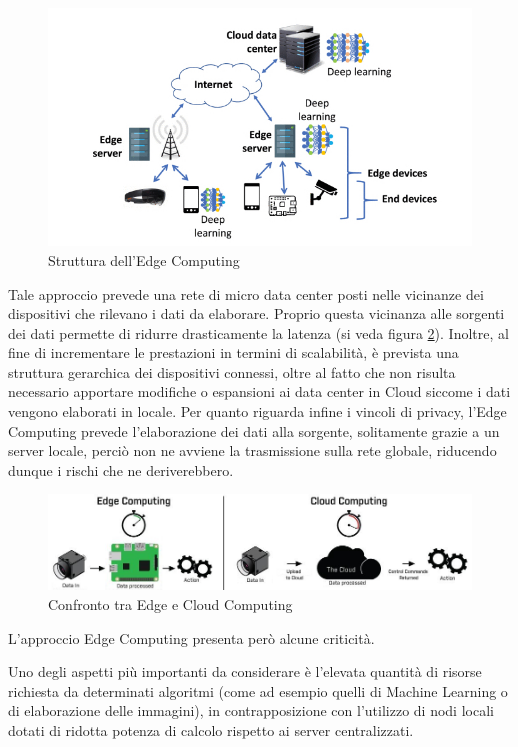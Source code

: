 \begin{figure}[H]
	\centering
	\includegraphics[width=\linewidth]{pics/edgecomputing.jpeg}
	\caption{Struttura dell'Edge Computing}
	\label{edge}
\end{figure}

Tale approccio prevede una rete di micro data center posti nelle vicinanze dei dispositivi che rilevano i dati da elaborare. Proprio questa vicinanza alle sorgenti dei dati permette di ridurre drasticamente la latenza (si veda figura \ref{edgevs}). Inoltre, al fine di incrementare le prestazioni in termini di scalabilità, è prevista una struttura gerarchica dei dispositivi connessi, oltre al fatto che non risulta necessario apportare modifiche o espansioni ai data center in Cloud siccome i dati vengono elaborati in locale. Per quanto riguarda infine i vincoli di privacy, l'Edge Computing prevede l'elaborazione dei dati alla sorgente, solitamente grazie a un server locale, perciò non ne avviene la trasmissione sulla rete globale, riducendo dunque i rischi che ne deriverebbero.

\begin{figure}[H]
	\centering
	\includegraphics[width=\linewidth, height= 0.15 \textheight]{pics/edgevscloud.jpeg}
	\caption{Confronto tra Edge e Cloud Computing}
	\label{edgevs}
\end{figure}

L'approccio Edge Computing presenta però alcune criticità.

Uno degli aspetti più importanti da considerare è l'elevata quantità di risorse richiesta da determinati algoritmi (come ad esempio quelli di Machine Learning o di elaborazione delle immagini), in contrapposizione con l'utilizzo di nodi locali dotati di ridotta potenza di calcolo rispetto ai server centralizzati.

